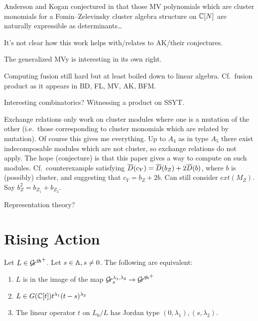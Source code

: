 \documentclass[draft]{article}
\begin{document}
Anderson and Kogan conjectured in \cite{anderson2006algebra}  that those MV polynomials which are cluster monomials for a Fomin--Zelevinsky cluster algebra structure on $\CC[N]$ are naturally expressible as determinants\dots

It's not clear how this work helps with/relates to AK/their conjectures.

The generalized MVy is interesting in its own right. 

Computing fusion still hard but at least boiled down to linear algebra. Cf.\ fusion product as it appears in BD, FL, MV, AK, BFM.

Interesting combinatorics? Witnessing a product on SSYT.

Exchange relations only work on cluster modules where one is a mutation of the other (i.e.\ those corresponding to cluster monomials which are related by mutation). Of course this gives me everything. Up to $A_4$ as in type $A_5$ there exist indecomposable modules which are not cluster, so exchange relations do not apply. The hope (conjecture) is that this paper gives a way to compute on such modules. Cf.\ counterexample satisfying $\barD(c_Y) = \barD(b_Z) + 2\barD(b)$, where $b$ is (possibly) cluster, and suggesting that $c_Y = b_Z + 2b$. Can still consider $ext(M_Z)$. Say $b_Z^2 = b_{Z_1} + b_{Z_2}$. 


Representation theory? 

\section{Rising Action} %

\begin{lemma} \label{le:Grl1l2}
    Let $ L \in \Grth^+ $.  Let $ s \in \AA, s \ne 0 $.  The following are equivalent:
    \begin{enumerate}
        \item $ L $ is in the image of the map $ \Gr^{\lambda_1, \lambda_2}_s \rightarrow \Grth^+$
        \item $ L \in G(\CC[t]) t^{\lambda_1} (t-s)^{\lambda_2}$
        \item The linear operator $ t $ on $ L_0/L$ has Jordan type $(0,\lambda_1), (s,\lambda_2)$.
    \end{enumerate}
\end{lemma}
\end{document}
